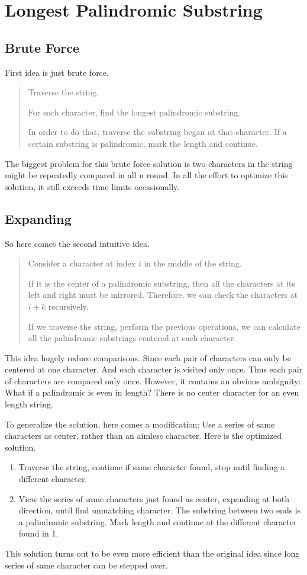 \documentclass[varwidth]{standalone}
\begin{document}
\section{Longest Palindromic Substring}
\subsection{Brute Force}
First idea is just brute force.

\begin{quote}
    Traverse the string.

    For each character, find the longest palindromic substring.

    In order to do that, traverse the substring began at that character.
    If a certain substring is palindromic, mark the length and continue.
\end{quote}
The biggest problem for this brute force solution is two characters in
the string might be repeatedly compared in all n round.
In all the effort to optimize this solution, it still exceeds time limits
occasionally.

\subsection{Expanding}
So here comes the second intuitive idea.

\begin{quote}
    Consider a character at index $i$ in the middle of the string.

    If it is the center of a palindromic substring,
    then all the characters at its left and right must be mirrored.
    Therefore, we can check the characters at $i\pm k$ recursively.

    If we traverse the string, perform the previous operations,
    we can calculate all the palindromic substrings centered at each character.
\end{quote}
This idea hugely reduce comparisons. Since each pair of characters can only
be centered at one character. And each character is visited only once.
Thus each pair of characters are compared only once.
However, it contains an obvious ambiguity: What if a palindromic is even in
length? There is no center character for an even length string.

To generalize the solution, here comes a modification:
Use a series of same characters as center, rather than an aimless character.
Here is the optimized solution.
\begin{enumerate}
    \item Traverse the string, continue if same character found, stop until finding
    a different character.

    \item View the series of same characters just found as center, expanding at both
    direction, until find unmatching character. The substring between two ends
    is a palindromic substring. Mark length and continue at the different
    character found in 1.
\end{enumerate}
This solution turns out to be even more efficient than the original idea since long
series of same character can be stepped over.
\end{document}
